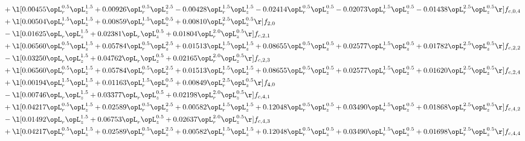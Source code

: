 \begin{alignat}{2}
& + \l[  0.00455 \opL_r^{0.5} \opL_z^{1.5} +  0.00926 \opL_r^{0.5} \opL_z^{2.5}   -0.00428 \opL_r^{1.5} \opL_z^{1.5}   -0.02414 \opL_r^{0.5} \opL_z^{0.5}   -0.02073 \opL_r^{1.5} \opL_z^{0.5}   -0.01438 \opL_r^{2.5} \opL_z^{0.5}  \r] f_{c,0,4} \nonumber \\ 
& + \l[  0.00504 \opL_r^{1.5} \opL_z^{1.5} +  0.00859 \opL_r^{1.5} \opL_z^{0.5} +  0.00810 \opL_r^{2.5} \opL_z^{0.5}  \r] f_{2,0} \nonumber \\ 
& - \l[  0.01625 \opL_r \opL_z^{1.5} +  0.02381 \opL_r \opL_z^{0.5} +  0.01804 \opL_r^{2.0} \opL_z^{0.5}  \r] f_{c,2,1} \nonumber \\ 
& + \l[  0.06560 \opL_r^{0.5} \opL_z^{1.5} +  0.05784 \opL_r^{0.5} \opL_z^{2.5} +  0.01513 \opL_r^{1.5} \opL_z^{1.5} +  0.08655 \opL_r^{0.5} \opL_z^{0.5} +  0.02577 \opL_r^{1.5} \opL_z^{0.5} +  0.01782 \opL_r^{2.5} \opL_z^{0.5}  \r] f_{c,2,2} \nonumber \\ 
& - \l[  0.03250 \opL_r \opL_z^{1.5} +  0.04762 \opL_r \opL_z^{0.5} +  0.02165 \opL_r^{2.0} \opL_z^{0.5}  \r] f_{c,2,3} \nonumber \\ 
& + \l[  0.06560 \opL_r^{0.5} \opL_z^{1.5} +  0.05784 \opL_r^{0.5} \opL_z^{2.5} +  0.01513 \opL_r^{1.5} \opL_z^{1.5} +  0.08655 \opL_r^{0.5} \opL_z^{0.5} +  0.02577 \opL_r^{1.5} \opL_z^{0.5} +  0.01620 \opL_r^{2.5} \opL_z^{0.5}  \r] f_{c,2,4} \nonumber \\ 
& + \l[  0.00194 \opL_r^{1.5} \opL_z^{1.5} +  0.01163 \opL_r^{1.5} \opL_z^{0.5} +  0.00849 \opL_r^{2.5} \opL_z^{0.5}  \r] f_{4,0} \nonumber \\ 
& - \l[  0.00746 \opL_r \opL_z^{1.5} +  0.03377 \opL_r \opL_z^{0.5} +  0.02198 \opL_r^{2.0} \opL_z^{0.5}  \r] f_{c,4,1} \nonumber \\ 
& + \l[  0.04217 \opL_r^{0.5} \opL_z^{1.5} +  0.02589 \opL_r^{0.5} \opL_z^{2.5} +  0.00582 \opL_r^{1.5} \opL_z^{1.5} +  0.12048 \opL_r^{0.5} \opL_z^{0.5} +  0.03490 \opL_r^{1.5} \opL_z^{0.5} +  0.01868 \opL_r^{2.5} \opL_z^{0.5}  \r] f_{c,4,2} \nonumber \\ 
& - \l[  0.01492 \opL_r \opL_z^{1.5} +  0.06753 \opL_r \opL_z^{0.5} +  0.02637 \opL_r^{2.0} \opL_z^{0.5}  \r] f_{c,4,3} \nonumber \\ 
& + \l[  0.04217 \opL_r^{0.5} \opL_z^{1.5} +  0.02589 \opL_r^{0.5} \opL_z^{2.5} +  0.00582 \opL_r^{1.5} \opL_z^{1.5} +  0.12048 \opL_r^{0.5} \opL_z^{0.5} +  0.03490 \opL_r^{1.5} \opL_z^{0.5} +  0.01698 \opL_r^{2.5} \opL_z^{0.5}  \r] f_{c,4,4} \nonumber \\ 
\end{alignat} 


